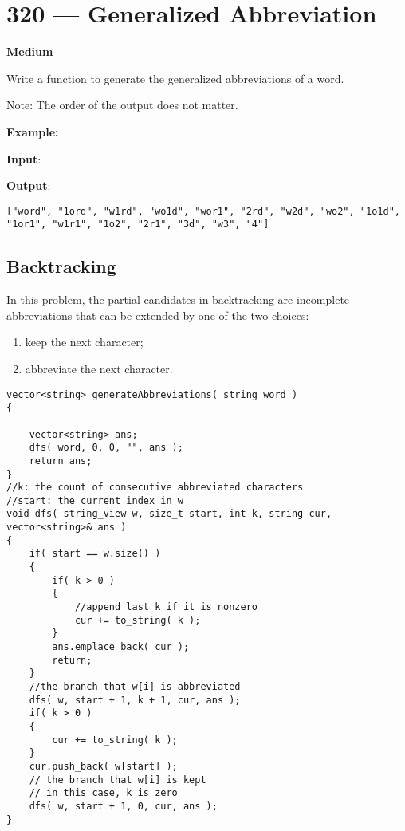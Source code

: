 \section{320 --- Generalized Abbreviation}

\textbf{Medium}

Write a function to generate the generalized abbreviations of a word. 

Note: The order of the output does not matter.

\textbf{Example:}

\begin{flushleft}
\textbf{Input}: 

\textbf{Output}:

\begin{lstlisting}[style=customc]
["word", "1ord", "w1rd", "wo1d", "wor1", "2rd", "w2d", "wo2", "1o1d", "1or1", "w1r1", "1o2", "2r1", "3d", "w3", "4"]
\end{lstlisting}
\end{flushleft}

\subsection{Backtracking}

In this problem, the partial candidates in backtracking are incomplete abbreviations that can be extended by one of the two choices:

\begin{enumerate}
\item keep the next character;
\item abbreviate the next character.
\end{enumerate}

\setcounter{lstlisting}{0}
\begin{lstlisting}[style=customc, caption={Backtracking}]
vector<string> generateAbbreviations( string word )
{

    vector<string> ans;
    dfs( word, 0, 0, "", ans );
    return ans;
}
//k: the count of consecutive abbreviated characters
//start: the current index in w
void dfs( string_view w, size_t start, int k, string cur, vector<string>& ans )
{
    if( start == w.size() )
    {
        if( k > 0 )
        {
            //append last k if it is nonzero
            cur += to_string( k );
        }
        ans.emplace_back( cur );
        return;
    }
    //the branch that w[i] is abbreviated
    dfs( w, start + 1, k + 1, cur, ans );
    if( k > 0 )
    {
        cur += to_string( k );
    }
    cur.push_back( w[start] );
    // the branch that w[i] is kept
    // in this case, k is zero
    dfs( w, start + 1, 0, cur, ans );
}
\end{lstlisting}

